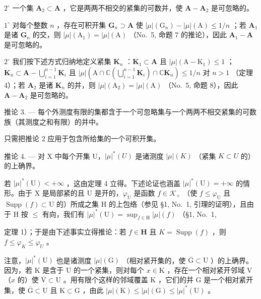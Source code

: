 \(2^{\circ}\) 一个集 \(\mathbf{A}_2\subset \mathbf{A}\) ，它是两两不相交的紧集的可数并，使 \(\mathbf{A} - \mathbf{A}_2\) 是可忽略的。

\(1^{\circ}\) 对每个整数 \(n\) ，存在可积开集 \(\mathbf{G}_n \supset \mathbf{A}\) 使 \(|\mu| (\mathrm{G}_n) - |\mu| (\mathrm{A}) \leqslant 1/n\) ；若 \(\mathbf{A}_1\) 是诸 \(\mathbf{G}_n\) 的交，则 \(|\mu| (\mathrm{A}_1) = |\mu| (\mathrm{A})\) （No.~5, 命题 7 的推论），因此 \(\mathbf{A}_1 - \mathbf{A}\) 是可忽略的。

\(2^{\circ}\) 我们按下述方式归纳地定义紧集 \(\mathbf{K}_n\) ：\(\mathbf{K}_1 \subset \mathbf{A}\) 且 \(|\mu| (\mathrm{A} - \mathrm{K}_1) \leqslant 1\) ；\(\mathbf{K}_n \subset \mathbf{A} - \bigcup_{i=1}^{n-1} \mathbf{K}_i\) 且 \(|\mu| (\mathrm{A} \cap \mathbb{C}(\bigcup_{i=1}^{n-1} \mathbf{K}_i) \cap \mathbb{C} \mathbf{K}_n) \leqslant 1/n\) 对 \(n > 1\) （定理 4）；若 \(\mathbf{A}_2\) 是诸 \(\mathbf{K}_n\) 的并，则 \(|\mu| (\mathrm{A}_2) = |\mu| (\mathrm{A})\) （No.~5, 命题 8），因此 \(\mathbf{A} - \mathbf{A}_2\) 是可忽略的。

推论 3. --- 每个外测度有限的集都含于一个可忽略集与一个两两不相交紧集的可数族（其测度之和有限）的并中。

只需把推论 2 应用于包含所给集的一个可积开集。

推论 4. --- 对 X 中每个开集 U，\(|\mu|^{*}(U)\) 是诸测度 \(|\mu|(K)\) （紧集 \(K \subset U\) 的）的上确界。

若 \(|\mu|^*(\mathrm{U}) < +\infty\) ，这由定理 4 立得。下述论证也涵盖 \(|\mu|^*(\mathrm{U}) = +\infty\) 的情形。由于 X 是局部紧的且 U 是开的，\(\varphi_{\mathrm{U}}\) 是函数 \(f \in \mathcal{K}_{+}\) （使 \(f \leqslant \varphi_{\mathrm{U}}\) 且 \(\operatorname{Supp}(f) \subset \mathrm{U}\) 的）所成之集 H 的上包络（参见 §1, No.~1, 引理的证明），且由于 H 按 \(\leqslant\) 有向，我们有 \(|\mu|^*(\mathrm{U}) = \sup_{f \in \mathrm{H}} |\mu|(f)\) （§1, No.~1,

定理 1）；于是由下述事实立得推论：若 \(f \in \mathbf{H}\) 且 \(K = \operatorname{Supp}(f)\) ，则 \(f \leqslant \varphi_{K} \leqslant \varphi_{U}\) 。

注意，\(|\mu|^*(\mathrm{U})\) 也是诸测度 \(|\mu|(\mathrm{G})\) （相对紧开集的，使 \(\overline{\mathrm{G}} \subset \mathrm{U}\) ）的上确界。因为，若 \(\mathrm{K}\) 是含于 \(\mathrm{U}\) 的一个紧集，则对每个 \(x \in \mathrm{K}\) ，存在一个相对紧开邻域 \(\mathrm{V}\) （\(x\) 的）使 \(\overline{\mathrm{V}} \subset \mathrm{U}\) 。用有限个这样的邻域覆盖 \(\mathrm{K}\) ，它们的并 \(\mathrm{G}\) 是一个相对紧开集，使 \(\overline{\mathrm{G}} \subset \mathrm{U}\) 且 \(\mathrm{K} \subset \mathrm{G}\) ，由此 \(|\mu|(\mathrm{K}) \leqslant |\mu|(\mathrm{G}) \leqslant |\mu|^*(\mathrm{U})\) 。

